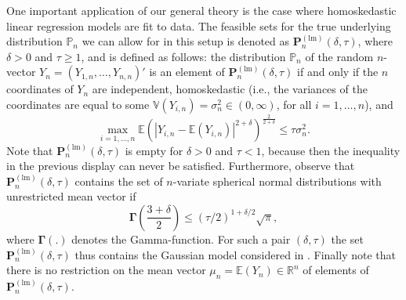 \documentclass[preprint]{imsart}
\newcommand{\R}{{\mathbb R}}
\newcommand{\E}{{\mathbb E}}
\newcommand{\V}{{\mathbb V}}
\renewcommand{\P}{{\mathbb P}}
\numberwithin{equation}{section}
\begin{document}
One important application of our general theory is the case where homoskedastic linear regression models are fit to data. The feasible sets for the true underlying distribution $\mathbb{P}_n$ we can allow for in this setup is denoted as $\mathbf{P}_n^{(\mathrm{lm})}\left(\delta, \tau \right)$, where $\delta > 0$ and $\tau \ge 1$, and is defined as follows: the distribution $\P_n$ of the random $n$-vector $Y_n = (Y_{1,n}, \hdots, Y_{n,n})'$ is an element of $\mathbf{P}_n^{(\mathrm{lm})}\left(\delta, \tau \right)$ if and only if the $n$ coordinates of $Y_n$ are independent, homoskedastic (i.e., the variances of the coordinates are equal to some $\V(Y_{i,n}) = \sigma_n^2 \in (0, \infty)$, for all $i=1,\dots, n$), and 
%
\begin{equation*}
\max_{i = 1, \hdots, n} \mathbb{E}\left(|Y_{i,n} - \mathbb{E}(Y_{i,n})|^{2+\delta}\right)^{\frac{2}{2+\delta}} \leq \tau \sigma_n^2.
\end{equation*}
%
%
%
Note that $\mathbf{P}_n^{(\mathrm{lm})} \left(\delta, \tau \right)$ is empty for $\delta>0$ and $\tau< 1$, because then the inequality in the previous display can never be satisfied. Furthermore, observe that $\mathbf{P}_n^{(\mathrm{lm})} \left(\delta, \tau \right)$ contains the set of $n$-variate spherical normal distributions with unrestricted mean vector if 
$$
\mathbf{\Gamma}\left( \frac{3+\delta}{2}\right) \le \left( \tau/2 \right)^{1+\delta/2}\sqrt{\pi},
$$
where $\mathbf{\Gamma}(.)$ denotes the Gamma-function. For such a pair $(\delta,\tau)$ the set $\mathbf{P}_n^{(\mathrm{lm})} \left(\delta, \tau \right)$ thus contains the Gaussian model considered in \citet{Berk13}. Finally note that there is no restriction on the mean vector $\mu_n = \E(Y_n)\in\R^n$ of elements of $\mathbf{P}_n^{(\mathrm{lm})} \left(\delta, \tau \right)$.
\end{document}
